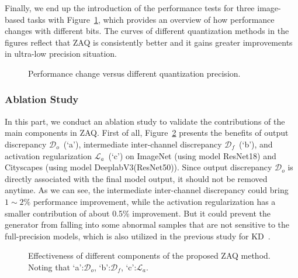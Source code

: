 \documentclass[final]{cvpr}
\begin{document}
Finally, we end up the introduction of the performance tests for three image-based tasks with Figure~\ref{fig:bit_Acc}, which provides an overview of how performance changes with different bits.
The curves of different quantization methods in the figures reflect that ZAQ is consistently better and it gains greater improvements in ultra-low precision situation. 

\begin{figure}[!h]
  \vspace{-2mm}
  \centering



  \caption{Performance change versus different quantization precision.}
  \label{fig:bit_Acc}
  \vspace{-2mm}
\end{figure}


\subsubsection{Ablation Study}

In this part, we conduct an ablation study to validate the contributions of the main components in ZAQ.
First of all, Figure~\ref{fig:ablation} presents the benefits of output discrepancy $\mathcal{D}_o$~(`a'), intermediate inter-channel discrepancy $\mathcal{D}_f$~(`b'), and activation regularization $\mathcal{L}_a$~(`c') on ImageNet (using model ResNet18) and Cityscapes (using model DeeplabV3(ResNet50)).
Since output discrepancy $\mathcal{D}_o$ is directly associated with the final model output, it should not be removed anytime.
As we can see, the intermediate inter-channel discrepancy could bring $1\sim2\%$ performance improvement, while the activation regularization has a smaller contribution of about 0.5\% improvement. 
But it could prevent the generator from falling into some abnormal samples that are not sensitive to the full-precision models, which is also utilized in the previous study for KD~\cite{chen2019data}.

\begin{figure}[!t]
  \centering
  \caption{Effectiveness of different components of the proposed ZAQ method. Noting that `a':$\mathcal{D}_o$, `b':$\mathcal{D}_f$, `c':$\mathcal{L}_a$.}
  \label{fig:ablation}
  \vspace{-2mm}
\end{figure}
\end{document}
